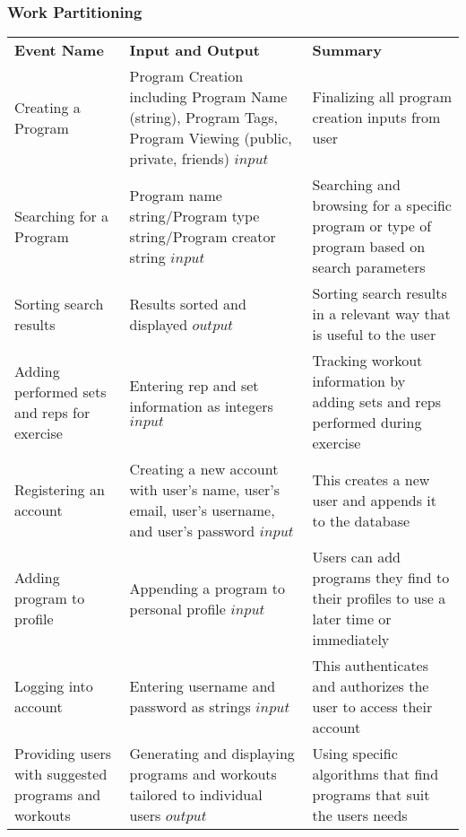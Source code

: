 \documentclass[12pt]{article}
\begin{document}
\subsubsection{Work Partitioning}
\begin{center}
\begin{tabular}{ |p{5cm}|p{5cm}|p{5cm}| } 
 \hline
 \textbf{Event Name} & \textbf{Input and Output} & \textbf{Summary} \\ 
 Creating a Program  & Program Creation including Program Name (string), Program Tags, Program Viewing (public, private, friends) \(input\) & Finalizing all program creation inputs from user  \\ 
 Searching for a Program & Program name string/Program type string/Program creator string \(input\) & Searching and browsing for a specific program or type of program based on search parameters  \\ 
 Sorting search results & Results sorted and displayed \(output\) & Sorting search results in a relevant way that is useful to the user \\ 
 Adding performed sets and reps for exercise & Entering rep and set information as integers \(input\) & Tracking workout information by adding sets and reps performed during exercise \\ 
 Registering an account & Creating a new account with user's name, user's email, user's username, and user's password \(input\) & This creates a new user and appends it to the database \\ 
 Adding program to profile  & Appending a program to personal profile \(input\) & Users can add programs they find to their profiles to use a later time or immediately \\ 
 Logging into account & Entering username and password as strings \(input\) & This authenticates and authorizes the user to access their account  \\ 
 Providing users with suggested programs and workouts & Generating and displaying programs and workouts tailored to individual users \(output\) & Using specific algorithms that find programs that suit the users needs \\ 
 \hline
\end{tabular}
\end{center}
\end{document}
